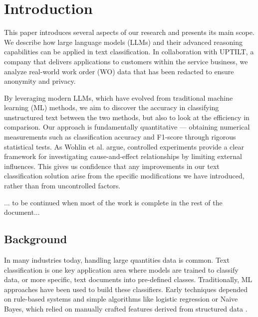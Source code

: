 \section{Introduction}

This paper introduces several aspects of our research and presents its main scope. We describe how large language models (LLMs) and their advanced reasoning capabilities can be applied in text classification. In collaboration with UPTILT, a company that delivers applications to customers within the service business, we analyze real-world work order (WO) data that has been redacted to ensure anonymity and privacy.

By leveraging modern LLMs, which have evolved from traditional machine learning (ML) methods, we aim to discover the accuracy in classifying unstructured text between the two methods, but also to look at the efficiency in comparison. Our approach is fundamentally quantitative --- obtaining numerical measurements such as classification accuracy and F1-score through rigorous statistical tests. As Wohlin et al. \cite{wohlin2000software} argue, controlled experiments provide a clear framework for investigating cause-and-effect relationships by limiting external influences. This gives us confidence that any improvements in our text classification solution arise from the specific modifications we have introduced, rather than from uncontrolled factors.

... to be continued when most of the work is complete in the rest of the document...

\subsection{Background}

In many industries today, handling large quantities data is common. Text classification is one key application area where models are trained to classify data, or more specific, text documents into pre-defined classes. Traditionally, ML approaches have been used to build these classifiers. Early techniques depended on rule-based systems and simple algorithms like logistic regression or Naive Bayes, which relied on manually crafted features derived from structured data \cite{bing2011mining}. 

